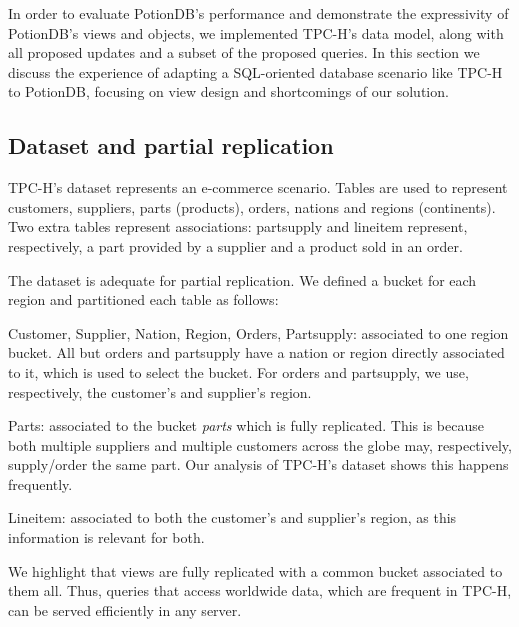 \documentclass{vldb}
\begin{document}
In order to evaluate PotionDB's performance and demonstrate the expressivity of PotionDB's views and objects, we implemented TPC-H's data model, along with all proposed updates and a subset of the proposed queries.
In this section we discuss the experience of adapting a SQL-oriented database scenario like TPC-H to PotionDB, focusing on view design and shortcomings of our solution.

\subsection{Dataset and partial replication}
\label{subsec:dataset}

TPC-H's dataset represents an e-commerce scenario. %
Tables are used to represent customers, suppliers, parts (products), orders, nations and regions (continents).
Two extra tables represent associations: partsupply and lineitem represent, respectively, a part provided by a supplier and a product sold in an order. %

The dataset is adequate for partial replication.
We defined a bucket for each region and partitioned each table as follows:

\begin{compactitem}
	\item Customer, Supplier, Nation, Region, Orders, Partsupply: associated to one region bucket. 
	All but orders and partsupply have a nation or region directly associated to it, which is used to select the bucket.
	For orders and partsupply, we use, respectively, the customer's and supplier's region.
	\item Parts: associated to the bucket \emph{parts} which is fully replicated.
	This is because both multiple suppliers and multiple customers across the globe may, respectively, supply/order the same part.
	Our analysis of TPC-H's dataset shows this happens frequently.
	\item Lineitem: associated to both the customer's and supplier's region, as this information is relevant for both.
\end{compactitem}

We highlight that views are fully replicated with a common bucket associated to them all.
Thus, queries that access worldwide data, which are frequent in TPC-H, can  be served efficiently in any server.
\end{document}
